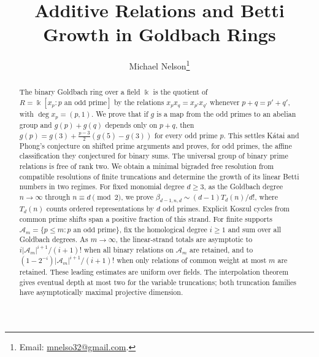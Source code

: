 \documentclass[11pt]{article}
\title{Additive Relations and Betti Growth in Goldbach Rings}
\author{Michael Nelson\thanks{Email: \href{mailto:mnelso32@gmail.com}{mnelso32@gmail.com}.}}
\date{}
\theoremstyle{definition}
\theoremstyle{remark}
\newcommand{\kk}{\Bbbk}
\newcommand{\A}{\mathcal A}
\begin{document}
\maketitle
\begin{abstract}
The binary Goldbach ring over a field $\kk$ is the quotient of
$R=\kk[x_p:p\text{ an odd prime}]$
by the relations $x_px_q=x_{p'}x_{q'}$ whenever $p+q=p'+q'$, with
$\deg x_p=(p,1)$. We prove that if $g$ is a map from the odd primes to an
abelian group and $g(p)+g(q)$ depends only on $p+q$, then
$g(p)=g(3)+\frac{p-3}{2}(g(5)-g(3))$ for every odd prime $p$.
This settles K\'atai and Phong's conjecture on shifted prime arguments
and proves, for odd primes, the affine classification they conjectured
for binary sums.
The universal group of binary prime relations is free of rank two.
We obtain a minimal bigraded free resolution from compatible resolutions
of finite truncations and determine the growth of its linear Betti numbers
in two regimes. For fixed monomial degree $d\ge3$, as the Goldbach degree
$n\to\infty$ through $n\equiv d\pmod2$, we prove
$\beta_{d-1,n,d}\sim(d-1)T_d(n)/d!$, where $T_d(n)$ counts ordered
representations by $d$ odd primes. Explicit Koszul cycles from common
prime shifts span a positive fraction of this strand.
For finite supports $\A_m=\{p\le m:p\text{ an odd prime}\}$, fix the
homological degree $i\ge1$ and sum over all Goldbach degrees.
As $m\to\infty$, the linear-strand totals are asymptotic to
$i|\A_m|^{i+1}/(i+1)!$ when all binary relations on $\A_m$ are retained,
and to $(1-2^{-i})|\A_m|^{i+1}/(i+1)!$ when only relations of common
weight at most $m$ are retained. These leading estimates are uniform
over fields. The interpolation theorem gives eventual depth at most two
for the variable truncations; both truncation families have
asymptotically maximal projective dimension.
\end{abstract}






\appendix



\end{document}
